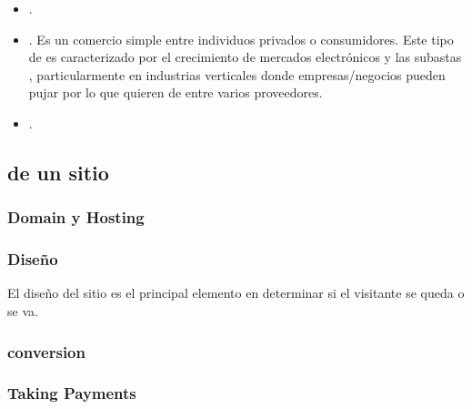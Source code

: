 \begin{itemize}
	\item \textbf{\gtog}.

	\item \textbf{\ctoc}. Es un comercio simple entre individuos privados o consumidores. Este tipo de \ecommerce es caracterizado por el crecimiento de mercados electrónicos y las subastas \online, particularmente en industrias verticales donde empresas/negocios pueden pujar por lo que quieren de entre varios proveedores.

	\item \textbf{\mcommerce}.
	
\end{itemize}

\subsection{\keyelements de un sitio \ecommerce \cite{inbook_ecommerce_keyelements}}

\subsubsection{Domain y Hosting}

\subsubsection{Diseño}
El diseño del sitio es el principal elemento en determinar si el visitante se queda o se va.

\subsubsection{\usability}

\subsubsection{conversion}

\subsubsection{\checkout}

\subsubsection{Taking Payments}

